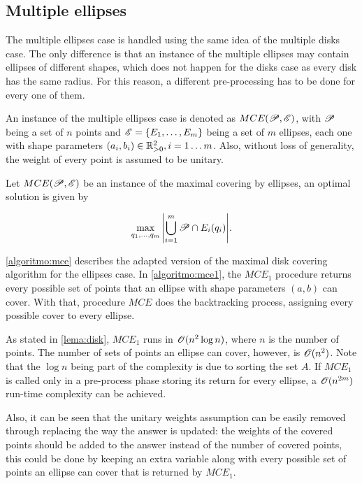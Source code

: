 \subsection{Multiple ellipses}

The multiple ellipses case is handled using the same idea of the multiple disks case. The only difference is that an instance of the multiple ellipses may contain ellipses of different shapes, which does not happen for the disks case as every disk has the same radius. For this reason, a different pre-processing has to be done for every one of them.

An instance of the multiple ellipses case is denoted as $MCE(\mathscr{P}, \mathscr{E})$, with $\mathscr{P}$ being a set of $n$ points and $\mathscr{E} = \{E_1, \dots, E_m\}$ being a set of $m$ ellipses, each one with shape parameters $(a_i, b_i) \in \mathbb{R}^2_{>0}, i = 1 \dots m$. Also, without loss of generality, the weight of every point is assumed to be unitary.

\begin{definicao}\label{def:MCE}
Let $MCE(\mathscr{P}, \mathscr{E})$ be an instance of the maximal covering by ellipses, an optimal solution is given by

\begin{equation}
    \max_{q_1, \dots, q_m}{\left|\bigcup_{i=1}^{m} \mathscr{P} \cap E_i(q_i)\right|}.
\end{equation}
\end{definicao}

\autoref{algoritmo:mce} describes the adapted version of the maximal disk covering algorithm for the ellipses case. In \autoref{algoritmo:mce1}, the $MCE_1$ procedure returns every possible set of points that an ellipse with shape parameters $(a,b)$ can cover. With that, procedure $MCE$ does the backtracking process, assigning every possible cover to every ellipse.

As stated in \autoref{lema:disk}, $MCE_1$ runs in $\mathscr{O}(n^2\log{n})$, where $n$ is the number of points. The number of sets of points an ellipse can cover, however, is $\mathscr{O}(n^2)$. Note that the $\log{n}$ being part of the complexity is due to sorting the set $A$. If $MCE_1$ is called only in a pre-process phase storing its return for every ellipse, a $\mathscr{O}(n^{2m})$ run-time complexity can be achieved. 

Also, it can be seen that the unitary weights assumption can be easily removed through replacing the way the answer is updated: 
the weights of the covered points should be added to the answer instead of the number of covered points, this could be done by keeping an extra variable along with every possible set of points an ellipse can cover that is returned by $MCE_1$.

